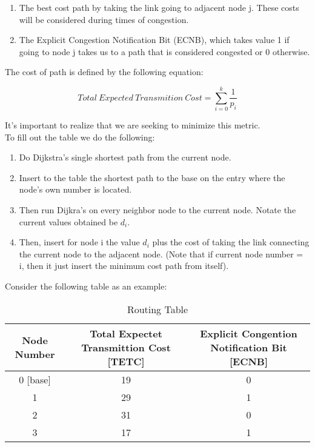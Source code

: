 \documentclass[letterpaper]{article}
\begin{document}
\begin{enumerate}
  \item The best cost path by taking the link going to adjacent node j. These costs will be considered during times of congestion.
  \item The Explicit Congestion Notification Bit (ECNB), which takes value 1 if going to node j takes us to a path that is considered congested or 0 otherwise.
\end{enumerate}

The cost of path is defined by the following equation:

$$  Total \ Expected \ Transmition \ Cost = \sum_{i=0}^{k}\frac{1}{p_{i}}$$

It's important to realize that we are seeking to minimize this metric.
\\

To fill out the table we do the following:

\begin{enumerate}
  \item Do Dijkstra's single shortest path from the current node.  
  \item Insert to the table the shortest path to the base on the entry where the node's own number is located.
  \item Then run Dijkra's on every neighbor node to the current node. Notate the current values obtained be $d_{i}$.
  \item Then, insert for node i the value $d_{i}$ plus the cost of taking the link connecting the current node to the adjacent node. (Note that if current node number = i, then it just insert the minimum cost path from itself).
\end{enumerate}

Consider the following table as an example:

\begin{table}[ht]
\caption{Routing Table} %
\centering %
\begin{tabular}{c c c} %
\hline
\hline %
Node Number & Total Expectet Transmittion Cost [TETC] & Explicit Congention Notification Bit [ECNB]  \\[0.5ex] %
\hline %
0 [base] & 19 & 0\\
1 & 29 & 1\\
2 & 31 & 0 \\
3 & 17 & 1\\ [1ex]
\hline
\end{tabular}
\label{table:nonlin}
\end{table}
\end{document}
